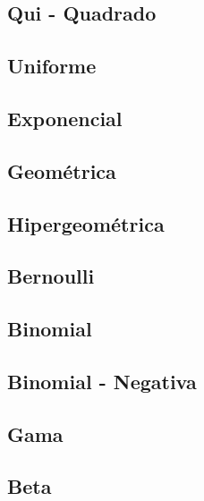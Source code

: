 \documentclass[
]{book}
\begin{document}
\hypertarget{qui---quadrado}{%
\subsection{Qui - Quadrado}\label{qui---quadrado}}

\hypertarget{uniforme}{%
\subsection{Uniforme}\label{uniforme}}

\hypertarget{exponencial}{%
\subsection{Exponencial}\label{exponencial}}

\hypertarget{geomuxe9trica}{%
\subsection{Geométrica}\label{geomuxe9trica}}

\hypertarget{hipergeomuxe9trica}{%
\subsection{Hipergeométrica}\label{hipergeomuxe9trica}}

\hypertarget{bernoulli}{%
\subsection{Bernoulli}\label{bernoulli}}

\hypertarget{binomial}{%
\subsection{Binomial}\label{binomial}}

\hypertarget{binomial---negativa}{%
\subsection{Binomial - Negativa}\label{binomial---negativa}}

\hypertarget{gama}{%
\subsection{Gama}\label{gama}}

\hypertarget{beta}{%
\subsection{Beta}\label{beta}}
\end{document}
